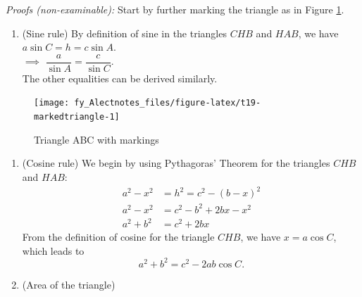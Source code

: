 \documentclass[
  12pt,
  oneside]{book}
\providecommand{\tightlist}{%
  \setlength{\itemsep}{0pt}\setlength{\parskip}{0pt}}
\theoremstyle{definition}
\theoremstyle{definition}
\theoremstyle{definition}
\theoremstyle{definition}
\theoremstyle{remark}
\begin{document}
\emph{Proofs (non-examinable):} Start by further marking the triangle as in Figure \ref{fig:t19-markedtriangle}.

\begin{enumerate}
\def\labelenumi{\arabic{enumi}.}
\tightlist
\item
  (Sine rule) By definition of sine in the triangles \(CHB\) and \(HAB\), we have \(a\sin C=h=c\sin A\).\\
  \(\implies\) \(\dfrac{a}{\sin A}=\dfrac{c}{\sin C}\).\\
  The other equalities can be derived similarly.
\end{enumerate}

\begin{figure}

{\centering \texttt{[image: fy\_Alectnotes\_files/figure-latex/t19-markedtriangle-1]} 

}

\caption{Triangle ABC with markings}\label{fig:t19-markedtriangle}
\end{figure}

\begin{enumerate}
\def\labelenumi{\arabic{enumi}.}
\setcounter{enumi}{1}
\item
  (Cosine rule) We begin by using Pythagoras' Theorem for the triangles \(CHB\) and \(HAB\):
  \begin{align*}
  a^2-x^2 &= h^2 = c^2-(b-x)^2\\
  a^2-x^2 &=c^2-b^2+2bx - x^2\\
  a^2+b^2 &= c^2+2bx
  \end{align*}
  From the definition of cosine for the triangle \(CHB\), we have \(x=a\cos C\), which leads to
  \[
  a^2+b^2=c^2-2ab\cos C.
  \]
\item
  (Area of the triangle)
\end{enumerate}
\end{document}
